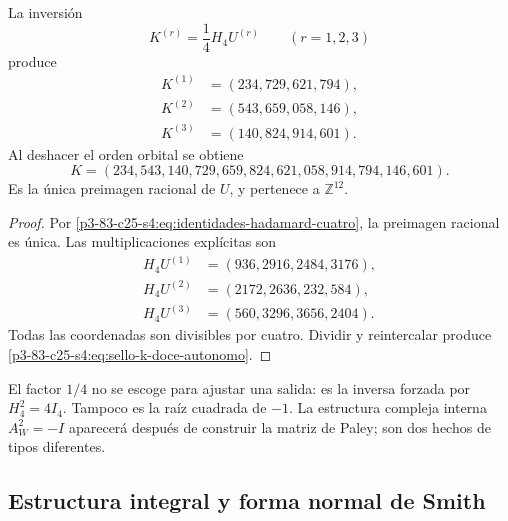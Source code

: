 \begin{theorem}
\label{p3-83-c25-s4:thm:reconstruccion-entera-k-hadamard}
La inversión
\begin{equation}
 K^{(r)}=\frac14H_4U^{(r)}
 \qquad(r=1,2,3)
 \label{p3-83-c25-s4:eq:inversion-bloques-hadamard}
\end{equation}
produce
\begin{align*}
 K^{(1)}&=(234,729,621,794),\\
 K^{(2)}&=(543,659,058,146),\\
 K^{(3)}&=(140,824,914,601).
\end{align*}
Al deshacer el orden orbital se obtiene
\begin{equation}
 \boxed{
 K=(234,543,140,729,659,824,621,058,914,794,146,601).}
 \label{p3-83-c25-s4:eq:sello-k-doce-autonomo}
\end{equation}
Es la única preimagen racional de \(U\), y pertenece a
\(\mathbb Z^{12}\).
\end{theorem}

\begin{proof}
Por \eqref{p3-83-c25-s4:eq:identidades-hadamard-cuatro}, la preimagen racional es única.
Las multiplicaciones explícitas son
\begin{align*}
 H_4U^{(1)}&=(936,2916,2484,3176),\\
 H_4U^{(2)}&=(2172,2636,232,584),\\
 H_4U^{(3)}&=(560,3296,3656,2404).
\end{align*}
Todas las coordenadas son divisibles por cuatro. Dividir y reintercalar
produce \eqref{p3-83-c25-s4:eq:sello-k-doce-autonomo}.
\end{proof}

El factor \(1/4\) no se escoge para ajustar una salida: es la inversa
forzada por \(H_4^2=4I_4\). Tampoco es la raíz cuadrada de \(-1\). La
estructura compleja interna \(A_W^2=-I\) aparecerá después de construir la
matriz de Paley; son dos hechos de tipos diferentes.

\subsection{Estructura integral y forma normal de Smith}

